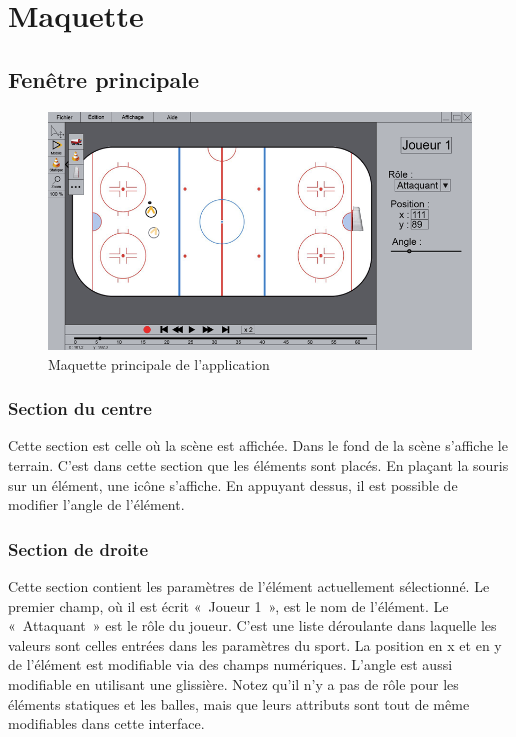 \chapter{Maquette}
\label{s:mockup}

\section{Fenêtre principale}

\begin{figure}[H]
	\centering
	\includegraphics[width=\textwidth]{mockup/mockup.png}
	\caption{Maquette principale de l'application}
	\label{fig:mock-up}
\end{figure}

\subsection{Section du centre}

Cette section est celle où la scène est affichée. Dans le fond de la scène s'affiche le terrain. C'est dans cette section que les éléments sont placés. En plaçant la souris sur un élément, une icône s'affiche. En appuyant dessus, il est possible de modifier l'angle de l'élément.

\subsection{Section de droite}

Cette section contient les paramètres de l'élément actuellement sélectionné. Le premier champ, où il est écrit «~Joueur 1~», est le nom de l'élément. Le «~Attaquant~» est le rôle du joueur. C'est une liste déroulante dans laquelle les valeurs sont celles entrées dans les paramètres du sport. La position en x et en y de l'élément est modifiable via des champs numériques. L'angle est aussi modifiable en utilisant une glissière. Notez qu'il n'y a pas de rôle pour les éléments statiques et les balles, mais que leurs attributs sont tout de même modifiables dans cette interface.

